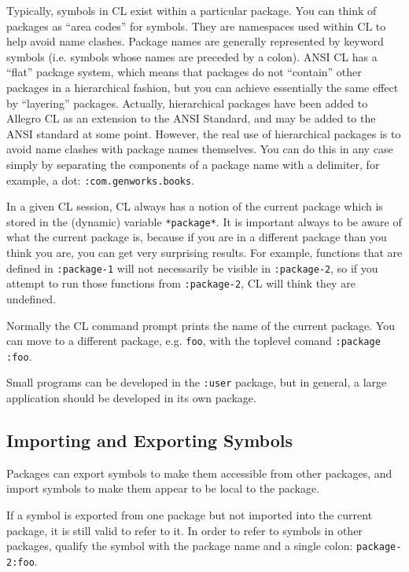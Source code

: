 Typically, symbols in CL exist within a particular package. You can think of packages as
``area codes'' for symbols. They are namespaces used within CL to help avoid name clashes.
Package names are generally represented by keyword symbols (i.e. symbols whose names
are preceded by a colon). ANSI CL has a ``flat'' package system, which means that packages
do not ``contain'' other packages in a hierarchical fashion, but you can achieve essentially
the same effect by ``layering'' packages. Actually, hierarchical packages have been added to
Allegro CL as an extension to the ANSI Standard, and may be added to the ANSI standard
at some point. However, the real use of hierarchical packages is to avoid name clashes with
package names themselves. You can do this in any case simply by separating the components
of a package name with a delimiter, for example, a dot: \texttt{:com.genworks.books}.

In a given CL session, CL always has a notion of the current package which is stored
in the (dynamic) variable \texttt{*package*}. It is important always to be aware of what the
current package is, because if you are in a different package than you think you are, you
can get very surprising results. For example, functions that are defined in \texttt{:package-1} will
not necessarily be visible in \texttt{:package-2}, so if you attempt to run those functions from
\texttt{:package-2}, CL will think they are undefined.

Normally the CL command prompt prints the name of the current package. You can
move to a different package, e.g. \texttt{foo}, with the toplevel comand \texttt{:package :foo}.

Small programs can be developed in the \texttt{:user} package, but in general, a large application should be developed in its own package.

\subsection{Importing and Exporting Symbols}

Packages can export symbols to make them accessible from other packages, and import
symbols to make them appear to be local to the package.

If a symbol is exported from one package but not imported into the current package, it
is still valid to refer to it. In order to refer to symbols in other packages, qualify the symbol
with the package name and a single colon: \texttt{package-2:foo}.

